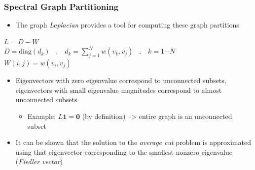 \documentclass[9pt]{beamer}
\newcommand{\bv}[1]{\mathbf{#1}}
\begin{document}
\begin{frame}
\frametitle{Spectral Graph Partitioning}
\label{sec-2-3}

\begin{itemize}
\item The graph \emph{Laplacian} provides a tool for computing these graph partitions
\end{itemize}
$L = D - W$ \\
$D = \text{diag}(d_k) \;\;\; , \;\;\; d_k = \sum_{j=1}^N w(v_k,v_j) \;\;\; , \;\;\; k=1 \cdots N$ \\
$W(i,j) = w(v_i,v_j)$

\begin{itemize}
\item Eigenvectors with zero eigenvalue correspond to unconnected subsets,
  eigenvectors with small eigenvalue magnitudes correspond to almost
  unconnected subsets
\begin{itemize}
\item Example: $L \bv{1} = \bv{0}$ (by definition) --> entire graph is an unconnected subset
\end{itemize}
\item It can be shown that the solution to the \emph{average cut} problem is
  approximated using that eigenvector corresponding to the smallest
  nonzero eigenvalue (\emph{Fiedler vector})
\end{itemize}
\end{frame}
\end{document}
